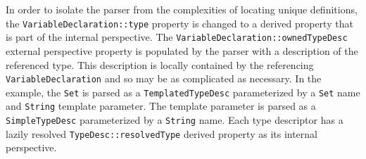 \documentclass{jot}
\begin{document}
In order to isolate the parser from the complexities of locating unique definitions, the \verb$VariableDeclaration::type$ property is changed to a derived property that is part of the internal perspective. The \verb$VariableDeclaration::ownedTypeDesc$ external perspective property is populated by the parser with a description of the referenced type. This description is locally contained by the referencing \verb$VariableDeclaration$ and so may be as complicated as necessary. In the example, the \verb$Set$ is parsed as a \verb$TemplatedTypeDesc$ parameterized by a \verb$Set$ name and \verb$String$ template parameter. The template parameter is parsed as a \verb$SimpleTypeDesc$ parameterized by a \verb$String$ name. Each type descriptor has a lazily resolved \verb$TypeDesc::resolvedType$ derived property as its internal perspective. 










\end{document}
